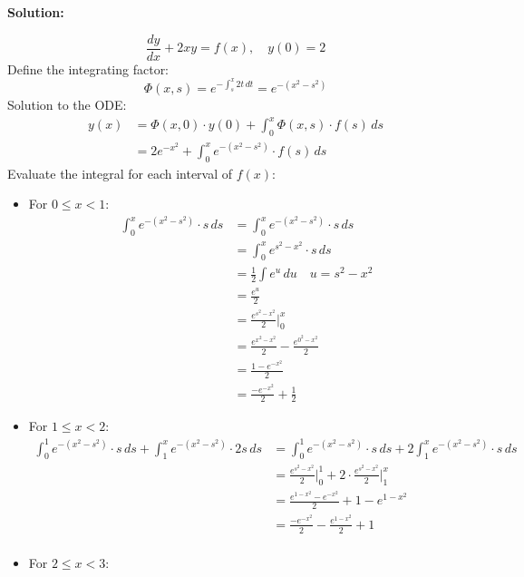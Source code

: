 \documentclass[12pt]{article}
\newenvironment{solution}{
    \textbf{Solution:}
    
}{
    
    \vspace{2em}
}
\begin{document}
\begin{solution}
    \[
        \frac{dy}{dx} + 2xy = f(x), \quad y(0) = 2
    \]
    Define the integrating factor:
    \[
        \Phi(x,s) = e^{-\int_{s}^{x} 2t \, dt} = e^{-(x^2 - s^2)}
    \]
    Solution to the ODE:
    \[
    \begin{aligned}
        y(x) &= \Phi(x,0) \cdot y(0) + \int_{0}^{x} \Phi(x,s) \cdot f(s) \, ds \\
        &= 2e^{-x^2} + \int_{0}^{x} e^{-(x^2 - s^2)} \cdot f(s) \, ds
    \end{aligned}
    \]
    Evaluate the integral for each interval of $f(x)$:
    \begin{itemize}
        \item For $0 \leq x < 1$:
        \[
        \begin{aligned}
            \int_{0}^{x} e^{-(x^2 - s^2)} \cdot s \, ds &= \int_{0}^{x} e^{-(x^2 - s^2)} \cdot s \, ds \\
            &= \int_{0}^{x} e^{s^2-x^2} \cdot s \, ds\\
            &= \frac{1}{2}\int e^{u} \, du \quad u = s^2 - x^2\\
            &= \frac{e^u}{2}\\
            &= \frac{e^{s^2 - x^2}}{2} \bigg|_{0}^{x}\\
            &= \frac{e^{x^2 - x^2}}{2} - \frac{e^{0^2 - x^2}}{2}\\
            &= \frac{1-e^{-x^2}}{2}\\
            &= \frac{-e^{-x^2}}{2} + \frac{1}{2}
        \end{aligned}
        \]
        \item For $1 \leq x < 2$:
        \[
        \begin{aligned}
            \int_{0}^{1} e^{-(x^2 - s^2)} \cdot s \, ds + \int_{1}^{x} e^{-(x^2 - s^2)} \cdot 2s \, ds &= \int_{0}^{1} e^{-(x^2 - s^2)} \cdot s \, ds + 2\int_{1}^{x} e^{-(x^2 - s^2)} \cdot s \, ds \\
            &= \frac{e^{s^2 - x^2}}{2} \bigg|_{0}^{1} + 2 \cdot \frac{e^{s^2 - x^2}}{2} \bigg|_{1}^{x}\\
            &= \frac{e^{1-x^2} - e^{-x^2}}{2} + 1 - e^{1-x^2}\\
            &= \frac{-e^{-x^2}}{2} - \frac{e^{1-x^2}}{2} + 1\\
        \end{aligned}
        \]
        \item For $2 \leq x < 3$:
        \[
        \begin{aligned}

\end{aligned}\]
\end{itemize}
\end{solution}
\end{document}
